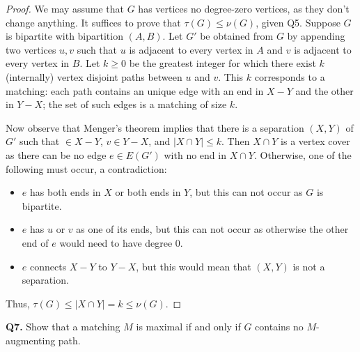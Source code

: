 \begin{proof}
We may assume that \( G \) has vertices no degree-zero vertices, as they don't change anything. It suffices to prove that \( \tau (G) \leq \nu (G) \), given Q5. Suppose \( G \) is bipartite with bipartition \( (A,B) \). Let \( G' \) be obtained from \( G \) by appending two vertices \( u,v \) such that \( u \) is adjacent to every vertex in \( A \) and \( v \) is adjacent to every vertex in \( B \). Let \( k \geq 0 \) be the greatest integer for which there exist \( k \) (internally) vertex disjoint paths between \( u \) and \( v \). This \( k \) corresponds to a matching: each path contains an unique edge with an end in \( X - Y \) and the other in \( Y - X \); the set of such edges is a matching of size \( k \).

Now observe that Menger's theorem implies that there is a separation \( (X, Y) \) of \( G' \) such that \(  \in X - Y \), \( v \in Y - X \), and \( |X \cap Y| \leq k \). Then \( X \cap Y \) is a vertex cover as there can be no edge \( e \in E(G') \) with no end in \( X \cap Y \). Otherwise, one of the following must occur, a contradiction: 
\begin{itemize}[nolistsep]
	\item \( e \) has both ends in \( X \) or both ends in \( Y \), but this can not occur as \( G \) is bipartite.
	\item \( e \) has \( u \) or \( v \) as one of its ends, but this can not occur as otherwise the other end of \( e \) would need to have degree 0.
	\item \( e \) connects \( X - Y \) to \( Y - X \), but this would mean that \( (X,Y) \) is not a separation.
\end{itemize}
Thus, \( \tau (G) \leq |X \cap Y| = k \leq \nu (G) \).
\end{proof}
\noindent \textbf{Q7.} Show that a matching \( M \) is maximal if and only if \( G \) contains no \( M \)-augmenting path.
